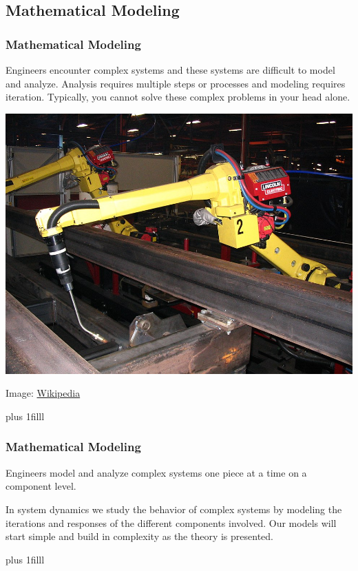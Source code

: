 \documentclass[fleqn]{beamer} %
\newcommand{\sectionIIIsubsectionItitle}{Mathematical Modeling}
\newcommand{\btVFill}{\vskip0pt plus 1filll}
\begin{document}
		\subsection{\sectionIIIsubsectionItitle}\label{sectionIIIsubsectionI}

			\begin{frame}
				\frametitle{\sectionIIIsubsectionItitle}
				\bigskip
				\begin{multicols}{2}
				Engineers encounter complex systems and these systems are difficult to model and analyze.  Analysis requires multiple steps or processes and modeling requires iteration. Typically, you cannot solve these complex problems in your head alone. \vspc

				\includegraphics[scale=.15]{images/fanuc_robot.jpg}
				\end{multicols}
				{\tiny \hspace{60mm} Image: \href{https://en.wikipedia.org/wiki/Articulated_robot}{Wikipedia} }
		
				\btVFill
			\end{frame}

			\begin{frame}
				\frametitle{\sectionIIIsubsectionItitle}
				\bigskip
				Engineers model and analyze complex systems one piece at a time on a component level. \vspc

				In system dynamics we study the behavior of complex systems by modeling the iterations and responses of the different components involved. Our models will start simple and build in complexity as the theory is presented. 
	
				\btVFill
			\end{frame}
\end{document}
